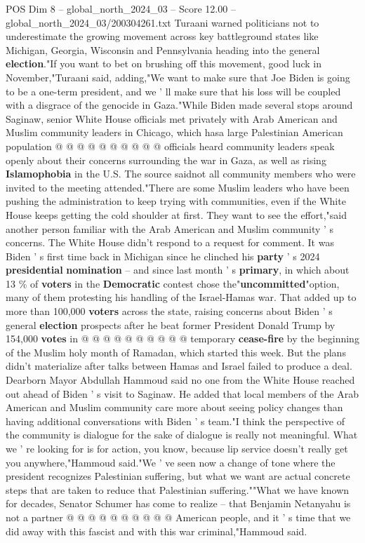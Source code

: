 \begin{textsample}{POS Dim 8 – global\_north\_2024\_03 – Score 12.00 – global\_north\_2024\_03/200304261.txt}
Turaani warned politicians not to underestimate the growing movement across key battleground states like Michigan, Georgia, Wisconsin and Pennsylvania heading into the general \textbf{election}."If you want to bet on brushing off this movement, good luck in November,"Turaani said, adding,"We want to make sure that Joe Biden is going to be a one-term president, and we ' ll make sure that his loss will be coupled with a disgrace of the genocide in Gaza."While Biden made several stops around Saginaw, senior White House officials met privately with Arab American and Muslim community leaders in Chicago, which hasa large Palestinian American population @ @ @ @ @ @ @ @ @ @ officials heard community leaders speak openly about their concerns surrounding the war in Gaza, as well as rising \textbf{Islamophobia} in the U.S.
The source saidnot all community members who were invited to the meeting attended."There are some Muslim leaders who have been pushing the administration to keep trying with communities, even if the White House keeps getting the cold shoulder at first.
They want to see the effort,"said another person familiar with the Arab American and Muslim community ' s concerns.
The White House didn't respond to a request for comment.
It was Biden ' s first time back in Michigan since he clinched his \textbf{party} ' s 2024 \textbf{presidential} \textbf{nomination} -- and since last month ' s \textbf{primary}, in which about 13 \% of \textbf{voters} in the \textbf{Democratic} contest chose the"\textbf{uncommitted}"option, many of them protesting his handling of the Israel-Hamas war.
That added up to more than 100,000 \textbf{voters} across the state, raising concerns about Biden ' s general \textbf{election} prospects after he beat former President Donald Trump by 154,000 \textbf{votes} in @ @ @ @ @ @ @ @ @ @ temporary \textbf{cease-fire} by the beginning of the Muslim holy month of Ramadan, which started this week.
But the plans didn't materialize after talks between Hamas and Israel failed to produce a deal.
Dearborn Mayor Abdullah Hammoud said no one from the White House reached out ahead of Biden ' s visit to Saginaw.
He added that local members of the Arab American and Muslim community care more about seeing policy changes than having additional conversations with Biden ' s team."I think the perspective of the community is dialogue for the sake of dialogue is really not meaningful.
What we ' re looking for is for action, you know, because lip service doesn't really get you anywhere,"Hammoud said."We ' ve seen now a change of tone where the president recognizes Palestinian suffering, but what we want are actual concrete steps that are taken to reduce that Palestinian suffering.""What we have known for decades, Senator Schumer has come to realize -- that Benjamin Netanyahu is not a partner @ @ @ @ @ @ @ @ @ @ American people, and it ' s time that we did away with this fascist and with this war criminal,"Hammoud said.

\end{textsample}
